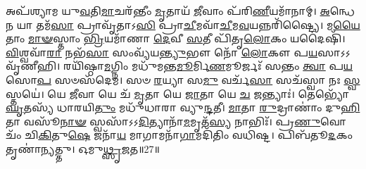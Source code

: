 𑌅𑌪᳴𑌶𑍍𑌯𑌾𑌮 𑌯𑍁\-\ul{𑌵}\-𑌤𑌿\-\ul{𑌮𑌾}\-𑌚𑌰᳴𑌨𑍍𑌤𑍀𑌂 \ul{𑌮𑍃}\-𑌤𑌾𑌯᳴ \ul{𑌜𑍀}\-𑌵𑌾𑌂 𑌪᳴𑌰𑌿\-\ul{𑌣𑍀}\-𑌯𑌮𑌾᳴𑌨𑌾𑌮𑍍। 
\-\ul{𑌅}\-𑌨𑍍𑌧𑍇\-\ul{𑌨} 𑌯𑌾 𑌤𑌮᳴\-\ul{𑌸𑌾} 𑌪𑍍𑌰𑌾𑌵𑍃᳴𑌤𑌾𑌽\-\ul{𑌸𑌿} 𑌪𑍍𑌰𑌾\-\ul{𑌚𑍀}\-𑌮𑌵𑌾᳴\-\ul{𑌚𑍀}\-𑌮\-\ul{𑌵}\-𑌯𑌨𑍍𑌨𑌰𑌿᳴𑌷𑍍𑌟𑍍𑌯𑍈। 
𑌮\-\ul{𑌯𑍈}\-𑌤𑌾𑌂 \ul{𑌮𑌾}\-\-\ul{𑍟}\-𑌸𑍍𑌤𑌾𑌂 \ul{𑌭𑍍𑌰𑌿}\-𑌯𑌮𑌾᳴𑌣𑌾 \ul{𑌦𑍇}\-𑌵𑍀 \ul{𑌸}\-𑌤𑍀 𑌪𑌿᳴𑌤𑍃\-\ul{𑌲𑍋}\-𑌕𑌂 𑌯𑌦𑍈𑌷𑌿᳴। 
\-\ul{𑌵𑌿}\-𑌶𑍍𑌵𑌵𑌾᳴\-\ul{𑌰𑌾} 𑌨𑌭᳴\-\ul{𑌸𑌾} 𑌸𑌂𑌵𑍍𑌯᳴𑌯\-\ul{𑌨𑍍𑌤𑍍𑌯𑍁}\-𑌭𑍗 𑌨𑍋᳴ \ul{𑌲𑍋}\-𑌕𑍗 𑌪\-\ul{𑌯}\-𑌸𑌾𑌽𑌽𑌵𑍃᳴𑌣𑍀𑌹𑌿। 
𑌰𑌯𑌿᳴𑌷𑍍𑌠𑌾\-\ul{𑌮}\-𑌗𑍍𑌨𑌿𑌂 𑌮𑌧𑍁᳴𑌮𑌨𑍍𑌤\-\ul{𑌮𑍂}\-𑌰𑍍𑌮𑌿\-\ul{𑌣}\-𑌮𑍂𑌰𑍍𑌜𑌃᳴ 𑌸𑌨𑍍𑌤𑌂 \ul{𑌤𑍍𑌵𑌾} 𑌪\-\ul{𑌯}\-𑌸𑍋\-\ul{𑌪} 𑌸𑍞𑌸᳴𑌦𑍇𑌮। 
𑌸𑍞 \ul{𑌰}\-𑌯𑍍𑌯𑌾 𑌸\-\ul{𑌮𑍁} 𑌵𑌰𑍍𑌚᳴\-\ul{𑌸𑌾} 𑌸𑌚᳴𑌸𑍍𑌵𑌾 𑌨𑌃 \ul{𑌸𑍍𑌵}\-𑌸𑍍𑌤𑌯𑍇॑। 
𑌯𑍇 \ul{𑌜𑍀}\-𑌵𑌾 𑌯𑍇 𑌚᳴ \ul{𑌮𑍃}\-𑌤𑌾 𑌯𑍇 \ul{𑌜𑌾}\-𑌤𑌾 𑌯𑍇 \ul{𑌚} 𑌜𑌨𑍍𑌤𑍍𑌯𑌾𑌃॑। 
𑌤𑍇𑌭𑍍𑌯𑍋᳴ \ul{𑌘𑍃}\-𑌤𑌸𑍍𑌯᳴ 𑌧𑌾𑌰𑌯𑌿\-\ul{𑌤𑍁𑌂} 𑌮𑌧𑍁᳴𑌧𑌾𑌰𑌾 𑌵𑍍𑌯𑍁\-\ul{𑌨𑍍𑌦}\-𑌤𑍀। 
\-\ul{𑌮𑌾}\-𑌤𑌾 \ul{𑌰𑍁}\-𑌦𑍍𑌰𑌾𑌣𑌾𑌂॑ 𑌦𑍁\-\ul{𑌹𑌿}\-𑌤𑌾 𑌵𑌸𑍂᳴\-\ul{𑌨𑌾}\-\-\ul{𑍟} 𑌸𑍍𑌵𑌸𑌾᳴𑌽𑌽\-\ul{𑌦𑌿}\-𑌤𑍍𑌯𑌾𑌨𑌾᳴\-\ul{𑌮}\-𑌮𑍃𑌤᳴\-\ul{𑌸𑍍𑌯} 𑌨𑌾𑌭𑌿𑌃᳴। 
𑌪𑍍𑌰\-\ul{𑌣𑍁}\-𑌵𑍋𑌚𑌂᳴ 𑌚𑌿\-\ul{𑌕𑌿}\-𑌤𑍁\-\ul{𑌷𑍇} 𑌜𑌨𑌾᳴\-\ul{𑌯} 𑌮𑌾𑌗𑌾𑌮𑌨𑌾᳴\-\ul{𑌗𑌾}\-𑌮𑌦𑌿᳴𑌤𑌿𑌂 𑌵𑌧𑌿𑌷𑍍𑌟। 
𑌪𑌿𑌬᳴𑌤𑍂\-\ul{𑌦}\-𑌕𑌂 𑌤𑍃𑌣𑌾॑𑌨𑍍𑌯𑌤𑍍𑌤𑍁। 
𑌓𑌮𑍁\-\ul{𑌥𑍍𑌸𑍃}\-𑌜𑌤॥27॥
\anuvakamend[\-\ul{𑌵}\-\-\ul{𑌧𑌿}\-\-\ul{𑌷𑍍𑌟} 𑌦𑍍𑌵𑍇 𑌚᳴]


